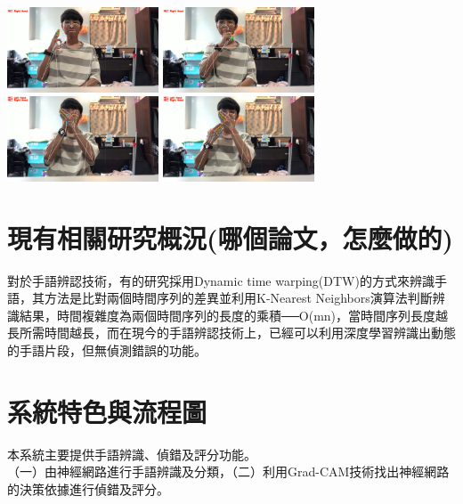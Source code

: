 \documentclass[12pt,a4paper]{report}
\begin{document}
\begin{CJK*}{UTF8}{bkai}
\begin{enumerate}
              \includegraphics[width=45mm]{bubbletea02.png}
              \includegraphics[width=45mm]{bubbletea03.png}\\
              \includegraphics[width=45mm]{bubbletea04.png}
              \includegraphics[width=45mm]{bubbletea05.png}

    \end{enumerate}
    \section{現有相關研究概況(哪個論文，怎麼做的)}
    \par
    對於手語辨認技術，有的研究採用Dynamic time warping(DTW)的方式來辨識手語，其方法是比對兩個時間序列的差異並利用K-Nearest Neighbors演算法判斷辨識結果，時間複雜度為兩個時間序列的長度的乘積──O(mn)，當時間序列長度越長所需時間越長，而在現今的手語辨認技術上，已經可以利用深度學習辨識出動態的手語片段，但無偵測錯誤的功能。
    \par

    \section{系統特色與流程圖}

    \par
    本系統主要提供手語辨識、偵錯及評分功能。\\
    （一）由神經網路進行手語辨識及分類，（二）利用Grad-CAM技術找出神經網路的決策依據進行偵錯及評分。


\end{CJK*}
\end{document}
